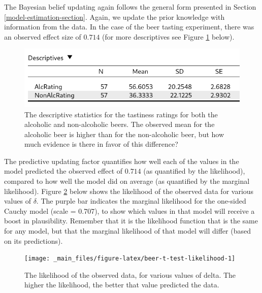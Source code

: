 \documentclass[
]{book}
\begin{document}
The Bayesian belief updating again follows the general form presented in Section \ref{model-estimation-section}. Again, we update the prior knowledge with information from the data. In the case of the beer tasting experiment, there was an observed effect size of \(0.714\) (for more descriptives see Figure \ref{fig:beer-tastiness-descriptives} below).

\begin{figure}

{\centering \includegraphics[width=1\linewidth]{Figures/DescriptivesBeerTastiness} 

}

\caption{The descriptive statistics for the tastiness ratings for both the alcoholic and non-alcoholic beers. The observed mean for the alcoholic beer is higher than for the non-alcoholic beer, but how much evidence is there in favor of this difference?}\label{fig:beer-tastiness-descriptives}
\end{figure}

The predictive updating factor quantifies how well each of the values in the model predicted the observed effect of \(0.714\) (as quantified by the likelihood), compared to how well the model did on average (as quantified by the marginal likelihood). Figure \ref{fig:beer-t-test-likelihood} below shows the likelihood of the observed data for various values of \(\delta\). The purple bar indicates the marginal likelihood for the one-sided Cauchy model (scale = 0.707), to show which values in that model will receive a boost in plausibility. Remember that it is the likelihood function that is the same for any model, but that the marginal likelihood of that model will differ (based on its predictions).

\begin{figure}

{\centering \texttt{[image: \_main\_files/figure-latex/beer-t-test-likelihood-1]} 

}

\caption{The likelihood of the observed data, for various values of delta. The higher the likelihood, the better that value predicted the data.}\label{fig:beer-t-test-likelihood}
\end{figure}
\end{document}

